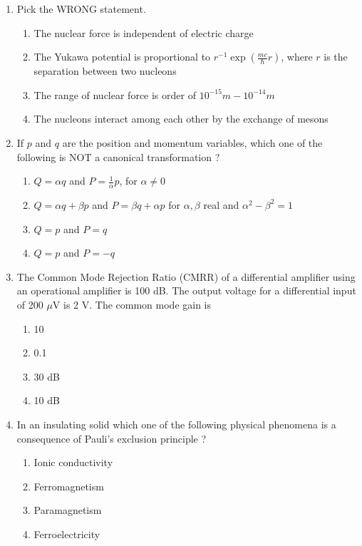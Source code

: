 \documentclass[journal,12pt,onecolumn]{IEEEtran}
\theoremstyle{remark}
\begin{document}
\begin{enumerate}
\begin{enumerate}
    \end{enumerate}
    \item Pick the WRONG statement.
    \begin{enumerate}
        \item The nuclear force is independent of electric charge
        \item The Yukawa potential is proportional to $r^{-1} \exp\left(\frac{mc}{\hbar} r\right)$, where $r$ is the separation between two nucleons
        \item The range of nuclear force is order of $10^{-15}m-10^{-14}m$
        \item The nucleons interact among each other by the exchange of mesons
    \end{enumerate}
    \item If $p$ and $q$ are the position and momentum variables, which one of the following is NOT a canonical transformation ?
    \begin{enumerate}
        \item $Q=\alpha q$ and $P= \frac{1}{\alpha}p$, for $\alpha \neq 0$
        \item $Q=\alpha q+\beta p$ and $P=\beta q+\alpha p$ for $\alpha,\beta$ real and $\alpha^2-\beta^2=1$
        \item $Q=p$ and $P=q$
        \item $Q=p$ and $P=-q$
    \end{enumerate}
    \item The Common Mode Rejection Ratio (CMRR) of a differential amplifier using an operational amplifier is 100 dB. The output voltage for a differential input of 200 $\mu$V is 2 V. The common mode gain is
    \begin{enumerate}
        \item 10
        \item 0.1
        \item 30 dB
        \item 10 dB
    \end{enumerate}
    \item In an insulating solid which one of the following physical phenomena is a consequence of Pauli's exclusion principle ?
    \begin{enumerate}
        \item Ionic conductivity
        \item Ferromagnetism
        \item Paramagnetism
        \item Ferroelectricity

\end{enumerate}
\end{enumerate}
\end{document}

